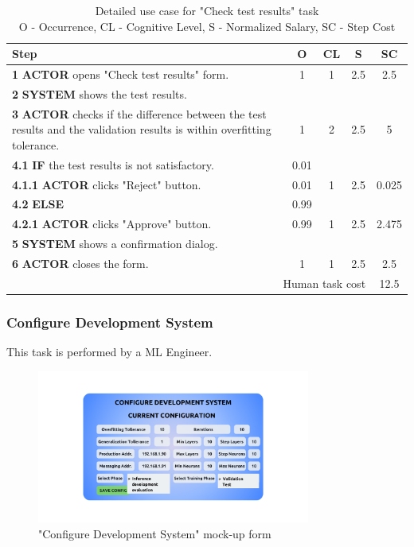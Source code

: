 \begin{table}[H]
\centering
\begin{tabularx}{\textwidth}{|X|c|c|c|c|}
\hline
\textbf{Step} & \textbf{O} & \textbf{CL} & \textbf{S} & \textbf{SC} \\
\hline
\textbf{1} \textbf{ACTOR} opens "Check test results" form. & 1 & 1 & 2.5 & 2.5 \\
\hline
\textbf{2} \textbf{SYSTEM} shows the test results. & & & & \\
\hline
\textbf{3} \textbf{ACTOR} checks if the difference between the test results and the validation results is within overfitting tolerance. & 1 & 2 & 2.5 & 5 \\
\hline
\textbf{4.1} \textbf{IF} the test results is not satisfactory. & 0.01 & & & \\
\hline
\textbf{4.1.1} \textbf{ACTOR} clicks "Reject" button. & 0.01 & 1 & 2.5 & 0.025 \\
\hline
\textbf{4.2} \textbf{ELSE} & 0.99 & & & \\
\hline
\textbf{4.2.1} \textbf{ACTOR} clicks "Approve" button. & 0.99 & 1 & 2.5 & 2.475 \\
\hline
\textbf{5} \textbf{SYSTEM} shows a confirmation dialog. & & & & \\
\hline
\textbf{6} \textbf{ACTOR} closes the form. & 1 & 1 & 2.5 & 2.5 \\
\hline
\multicolumn{4}{|r|}{Human task cost} & 12.5 \\
\hline
\end{tabularx}
\caption{Detailed use case for "Check test results" task\\ 
O - Occurrence, CL - Cognitive Level, S - Normalized Salary, SC - Step Cost}
\label{table:check_test_results}
\end{table}


\subsubsection{Configure Development System}

This task is performed by a ML Engineer.

\begin{figure}[H]
\centering
\includegraphics[width=0.8\textwidth]{figures/ui_configure_development.png}
\caption{"Configure Development System" mock-up form}
\end{figure}

